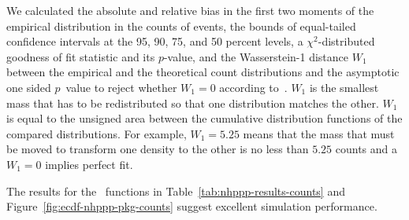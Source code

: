 \documentclass[article,nojss]{jss}\usepackage[]{graphicx}\usepackage[]{xcolor}
\begin{document}
We calculated the absolute and relative bias in the first two moments of the empirical distribution in the counts of events, the bounds of equal-tailed confidence intervals at the 95, 90, 75, and 50 percent levels, a $\chi^2$-distributed goodness of fit statistic and its $p$-value, and the Wasserstein-1 distance $W_1$ between the empirical and the theoretical count distributions and the asymptotic one sided $p$~value to reject whether $W_1 = 0$ according to~\citet{sommerfeld2018inference}. $W_1$ is the smallest mass that has to be redistributed so that one distribution matches the other. $W_1$ is equal to the unsigned area between the cumulative distribution functions of the compared distributions. For example, $W_1 = 5.25$ means that the mass that must be moved to transform one density to the other is no less than $5.25$ counts and a $W_1 = 0$ implies perfect fit.





The results for the~ functions in Table~\ref{tab:nhppp-results-counts} and Figure~\ref{fig:ecdf-nhppp-pkg-counts} suggest excellent simulation performance.
\end{document}
